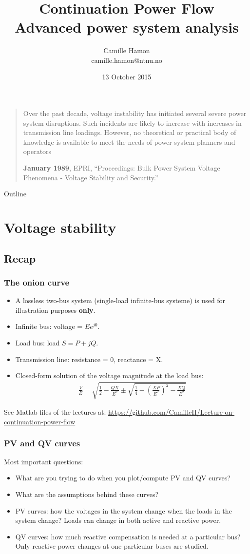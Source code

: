 \documentclass{beamer}
\title{Continuation Power Flow\\Advanced power system analysis}
\author{Camille Hamon\\camille.hamon@ntnu.no}
\date{13 October 2015}
\begin{document}
\begin{frame}[plain]
  \titlepage

\blockquote[\textbf{January 1989}, EPRI, “Proceedings: Bulk Power System Voltage Phenomena - Voltage Stability and Security.”]{Over the past decade, voltage instability has initiated several severe power system disruptions. Such incidents are likely to increase with increases in transmission line loadings. However, no theoretical or practical body of knowledge is available to meet the needs of power system planners and operators}
\end{frame}

\begin{frame}{Outline}
  \tableofcontents[subsectionstyle=hide]
\end{frame}

\section[Volt. Stab.]{Voltage stability}

\subsection{Recap}
\begin{frame}
  \frametitle{The onion curve}
  \begin{itemize}
\item A lossless two-bus system (single-load infinite-bus systeme) is used for illustration purposes \textbf{only}.
\item Infinite bus: voltage = $Ee^{j0}$.
\item Load bus: load $S = P+jQ$.
\item Transmission line: resistance = 0, reactance = X.
\item Closed-form solution of the voltage magnitude at the load bus:
  \begin{align*}
    \frac{V}{E} = \sqrt{\frac{1}{2}-\frac{QX}{E^2} \pm \sqrt{\frac{1}{4}-\left( \frac{XP}{E^2} \right)^2 - \frac{XQ}{E^2}}}
  \end{align*}
  \end{itemize}
See Matlab files of the lectures at: \url{https://github.com/CamilleH/Lecture-on-continuation-power-flow}
\end{frame}

\begin{frame}
  \frametitle{PV and QV curves}
Most important questions: 
\begin{itemize}
\item<1-> What are you trying to do when you plot/compute PV and QV curves?  
\item<2-> What are the assumptions behind these curves?
\item<3-> PV curves: how the voltages in the system change when the loads in the system change? Loads can change in both active and reactive power.
\item<4-> QV curves: how much reactive compensation is needed at a particular bus? Only reactive power changes at one particular buses are studied.
\end{itemize}
\end{frame}
\end{document}
